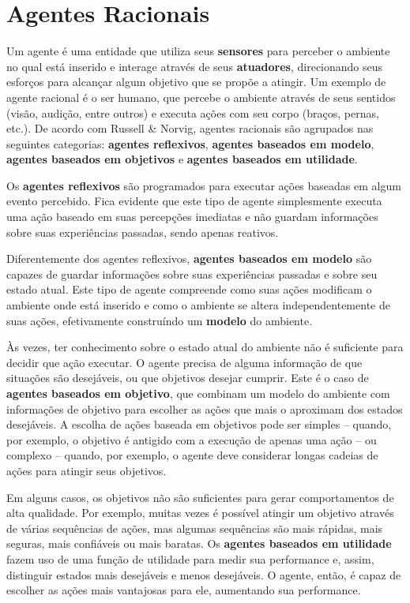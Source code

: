 \section{\label{section:agents}Agentes Racionais}
Um agente é uma entidade que utiliza seus \textbf{sensores} para perceber o
ambiente no qual está inserido e interage através de seus \textbf{atuadores},
direcionando seus esforços para alcançar algum objetivo que se propõe a
atingir\cite[cap. 2]{RussellNorvig200912}. Um exemplo de agente racional é o ser
humano, que percebe o ambiente através de seus sentidos (visão, audição, entre
outros) e executa ações com seu corpo (braços, pernas, etc.). De acordo com
Russell \& Norvig\cite{RussellNorvig200912}, agentes racionais são agrupados nas
seguintes categorias: \textbf{agentes reflexivos}, \textbf{agentes baseados em
modelo}, \textbf{agentes baseados em objetivos} e \textbf{agentes baseados em
utilidade}.

Os \textbf{agentes reflexivos} são programados para executar ações baseadas em
algum evento percebido. Fica evidente que este tipo de agente simplesmente
executa uma ação baseado em suas percepções imediatas e não guardam informações
sobre suas experiências passadas, sendo apenas reativos.

Diferentemente dos agentes reflexivos, \textbf{agentes baseados em modelo} são
capazes de guardar informações sobre suas experiências passadas e sobre seu
estado atual. Este tipo de agente compreende como suas ações modificam o
ambiente onde está inserido e como o ambiente se altera independentemente de
suas ações, efetivamente construíndo um \textbf{modelo} do ambiente. 

Às vezes, ter conhecimento sobre o estado atual do ambiente não é suficiente
para decidir que ação executar. O agente precisa de alguma informação de que
situações são desejáveis, ou que objetivos desejar cumprir. Este é o caso de
\textbf{agentes baseados em objetivo}, que combinam um modelo do ambiente com
informações de objetivo para escolher as ações que mais o aproximam dos estados
desejáveis. A escolha de ações baseada em objetivos pode ser simples -- quando,
por exemplo, o objetivo é antigido com a execução de apenas uma ação -- ou
complexo -- quando, por exemplo, o agente deve considerar longas cadeias de
ações para atingir seus objetivos.

Em alguns casos, os objetivos não são suficientes para gerar comportamentos de
alta qualidade. Por exemplo, muitas vezes é possível atingir um objetivo através
de várias sequências de ações, mas algumas sequências são mais rápidas, mais
seguras, mais confiáveis ou mais baratas. Os \textbf{agentes baseados em
utilidade} fazem uso de uma função de utilidade para medir sua performance e,
assim, distinguir estados mais desejáveis e menos desejáveis. O agente, então, é
capaz de escolher as ações mais vantajosas para ele, aumentando sua performance.


